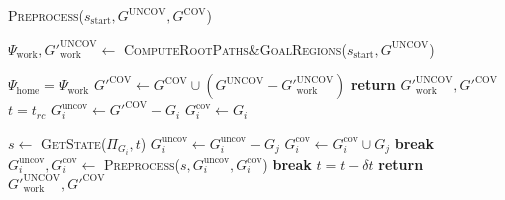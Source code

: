 \documentclass[letterpaper]{article} %
\begin{document}
\begin{algorithm}
\caption{\textsc{Preprocess}($s_{\textrm{start}},G^{\textrm{UNCOV}},G^{\textrm{COV}}$)}\label{alg:2}
\begin{algorithmic}[1]
\State $\Psi_{\textrm{work}}, G'^{\textrm{UNCOV}}_{\textrm{work}} \leftarrow$ \textsc{ComputeRootPaths\&GoalRegions}($s_{\textrm{start}},G^{\textrm{UNCOV}}$)

    \State $\Psi_{\textrm{home}} = \Psi_{\textrm{work}}$
\EndIf
\State $G'^{\textrm{COV}} \leftarrow G^{\textrm{COV}} \cup (G^{\textrm{UNCOV}} - G'^{\textrm{UNCOV}}_{\textrm{work}})$
    \State \textbf{return} $G'^{\textrm{UNCOV}}_{\textrm{work}}, G'^{\textrm{COV}}$
\EndIf
{}
    \State $t = t_{rc}$
    \State $G_i^{\textrm{uncov}} \leftarrow G'^{\textrm{COV}} - G_i$
    \State $G_i^{\textrm{cov}} \leftarrow G_i$

    
        \State $s \leftarrow$ \textsc{GetState($\Pi_{G_i}, t$)}
                \State $G_i^{\textrm{uncov}} \leftarrow G_i^{\textrm{uncov}} - G_j$
                \State $G_i^{\textrm{cov}} \leftarrow G_i^{\textrm{cov}} \cup G_j$
            \EndIf
        \EndFor
            \State \textbf{break}
        \EndIf
        \State $G_i^{\textrm{uncov}},G_i^{\textrm{cov}} \leftarrow$ \textsc{Preprocess}($s,G_i^{\textrm{uncov}},G_i^{\textrm{cov}}$)
            \State \textbf{break}
        \EndIf
        \State $t = t - \delta t$
    \EndWhile
\EndFor
\State \textbf{return} $G'^{\textrm{UNCOV}}_{\textrm{work}}, G'^{\textrm{COV}}$

\end{algorithmic}
\end{algorithm}
\end{document}

